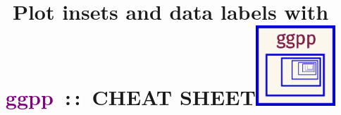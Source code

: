 \documentclass[DIV=25,a3,landscape,9pt]{scrartcl}\usepackage[]{graphicx}\usepackage[]{xcolor}
\begin{document}
\title{\huge Plot insets and data labels with \textcolor{purple}{ggpp}\ :\,:\ CHEAT SHEET\hfill\includegraphics[width=3cm]{logo-ggpp.png}}
\date{\null}



\maketitle\vspace{-20mm}
\end{document}
